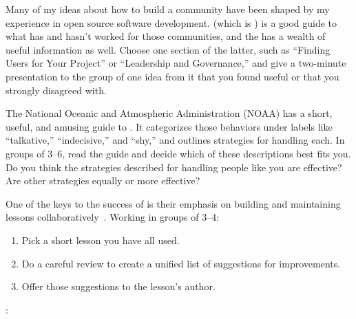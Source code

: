 
Many of my ideas about how to build a community
have been shaped by my experience in open source software development.
\cite{Foge2005} (which is )
is a good guide to what has and hasn't worked for those communities,
and the 
has a wealth of useful information as well.
Choose one section of the latter,
such as ``Finding Users for Your Project''
or ``Leadership and Governance,''
and give a two-minute presentation to the group of one idea from it
that you found useful or that you strongly disagreed with.


The National Oceanic and Atmospheric Administration (NOAA)
has a short, useful, and amusing guide to
.
It categorizes those behaviors under labels like ``talkative,'' ``indecisive,'' and ``shy,''
and outlines strategies for handling each.
In groups of 3--6,
read the guide and decide which of these descriptions best fits you.
Do you think the strategies described for handling people like you are effective?
Are other strategies equally or more effective?


One of the keys to the success of 
is their emphasis on building and maintaining lessons collaboratively~\cite{Wils2016,Deve2018}.
Working in groups of 3--4:

\begin{enumerate}

\item
  Pick a short lesson you have all used.

\item
  Do a careful review to create a unified list of suggestions for improvements.

\item
  Offer those suggestions to the lesson's author.

\end{enumerate}


:

